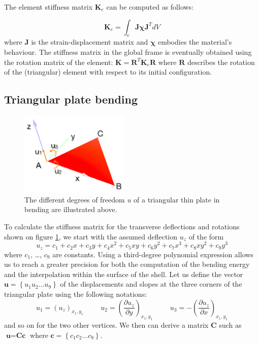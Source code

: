 \documentclass{llncs}
\begin{document}
The element stiffness matrix $\textbf{K}_e$ can be computed as follows:

\begin{equation}
\textbf{K}_e = \int_v \textbf{J} \boldsymbol{\chi} \textbf{J}^{T} dV
\end{equation}
where $\textbf{J}$ is the strain-displacement matrix and $\boldsymbol\chi$ embodies the material's behaviour. The stiffness matrix in the global frame is eventually obtained using the rotation matrix of the element: $\textbf{K} = \textbf{R}^{T} \textbf{K}_e \textbf{R} $ where $\textbf{R}$ describes the rotation of the (triangular) element with respect to its initial configuration.

\subsection{Triangular plate bending}

\begin{figure}
\centering
\includegraphics[height=4cm]{images/bending}
\caption {The different degrees of freedom $u$ of a triangular thin plate in bending are illustrated above.}
\label{fig-triangle}
\end{figure}

To calculate the stiffness matrix for the transverse deflections and rotations shown on figure \ref{fig-triangle}, we start with the assumed deflection $u_z$ of the form
\begin{equation}
 u_z = c_1 + c_2x + c_3y + c_4x^2 + c_5xy + c_6y^2 + c_7x^3 + c_8xy^2 + c_9y^3
\label{eq-deflection}
\end{equation} 
where $c_1$, \ldots , $c_9$ are constants. Using a third-degree polynomial expression allows us to reach a greater precision for both the computation of the bending energy and the interpolation within the surface of the shell. Let us define the vector $\textbf{u} = \left\{u_1 u_2 \ldots u_9 \right\} $ of the displacements and slopes at the three corners of the triangular plate using the following notations:
\begin{equation}
u_1 = (u_z)_{x_1,y_1} \hspace{1cm} u_2 = \left(\frac{\partial u_z}{\partial y}\right)_{x_1,y_1} \hspace{1cm} u_3 = - \left(\frac{\partial u_z}{\partial x}\right)_{x_1,y_1}
\end{equation} 
and so on for the two other vertices.
We then can derive a matrix $\textbf{C}$ such as $\textbf{u} = \textbf{Cc}$ where $\textbf{c} = \left\{c_1 c_2 \ldots c_9 \right\} $.
\end{document}
